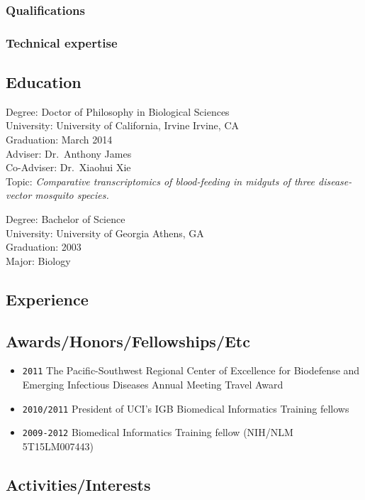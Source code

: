 \documentclass[letterpaper]{scrartcl}
\begin{document}
\subsubsection{Qualifications}\label{qualifications-1}

\subsubsection{Technical expertise}\label{technical-expertise}

\subsection{Education}\label{education}

Degree: Doctor of Philosophy in Biological Sciences\\University:
University of California, Irvine Irvine, CA\\Graduation: March
2014\\Adviser: Dr.~Anthony James\\Co-Adviser: Dr.~Xiaohui Xie\\Topic:
\emph{Comparative transcriptomics of blood-feeding in midguts of three
disease-vector mosquito species.}

Degree: Bachelor of Science\\University: University of Georgia Athens,
GA\\Graduation: 2003\\Major: Biology

\subsection{Experience}\label{experience}

\subsection{Awards/Honors/Fellowships/Etc}\label{awardshonorsfellowshipsetc}

\begin{itemize}
\item
  \texttt{2011} The Pacific-Southwest Regional Center of Excellence for
  Biodefense and Emerging Infectious Diseases Annual Meeting Travel
  Award
\item
  \texttt{2010/2011} President of UCI's IGB Biomedical Informatics
  Training fellows
\item
  \texttt{2009-2012} Biomedical Informatics Training fellow (NIH/NLM
  5T15LM007443)
\end{itemize}

\subsection*{Activities/Interests}\label{activitiesinterests}
\end{document}
